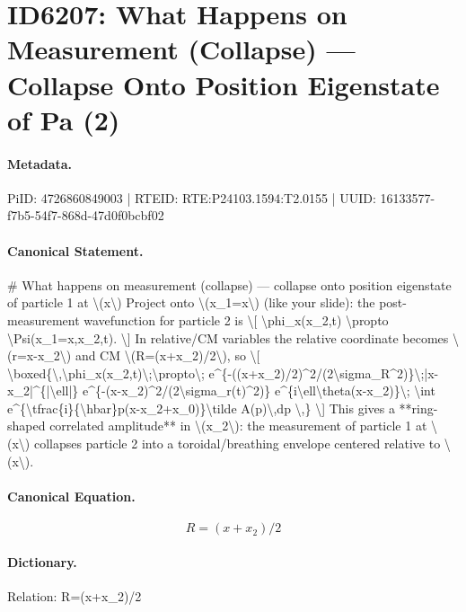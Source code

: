 \section*{ID6207: What Happens on Measurement (Collapse) — Collapse Onto Position Eigenstate of Pa (2)}
\paragraph{Metadata.}
PiID: 4726860849003 | RTEID: RTE:P24103.1594:T2.0155 | UUID: 16133577-f7b5-54f7-868d-47d0f0bcbf02

\paragraph{Canonical Statement.}
\# What happens on measurement (collapse) — collapse onto position eigenstate of particle 1 at \textbackslash{}(x\textbackslash{}) Project onto \textbackslash{}(x\_1=x\textbackslash{}) (like your slide): the post-measurement wavefunction for particle 2 is \textbackslash{}[ \textbackslash{}phi\_x(x\_2,t) \textbackslash{}propto \textbackslash{}Psi(x\_1=x,x\_2,t). \textbackslash{}] In relative/CM variables the relative coordinate becomes \textbackslash{}(r=x-x\_2\textbackslash{}) and CM \textbackslash{}(R=(x+x\_2)/2\textbackslash{}), so \textbackslash{}[ \textbackslash{}boxed\{\textbackslash{},\textbackslash{}phi\_x(x\_2,t)\textbackslash{};\textbackslash{}propto\textbackslash{}; e\textasciicircum{}\{-((x+x\_2)/2)\textasciicircum{}2/(2\textbackslash{}sigma\_R\textasciicircum{}2)\}\textbackslash{};|x-x\_2|\textasciicircum{}\{|\textbackslash{}ell|\} e\textasciicircum{}\{-(x-x\_2)\textasciicircum{}2/(2\textbackslash{}sigma\_r(t)\textasciicircum{}2)\} e\textasciicircum{}\{i\textbackslash{}ell\textbackslash{}theta(x-x\_2)\}\textbackslash{}; \textbackslash{}int e\textasciicircum{}\{\textbackslash{}tfrac\{i\}\{\textbackslash{}hbar\}p(x-x\_2+x\_0)\}\textbackslash{}tilde A(p)\textbackslash{},dp \textbackslash{},\} \textbackslash{}] This gives a **ring-shaped correlated amplitude** in \textbackslash{}(x\_2\textbackslash{}): the measurement of particle 1 at \textbackslash{}(x\textbackslash{}) collapses particle 2 into a toroidal/breathing envelope centered relative to \textbackslash{}(x\textbackslash{}).

\paragraph{Canonical Equation.}
\[
R=(x+x_2)/2
\]

\paragraph{Dictionary.}
Relation: R=(x+x\_2)/2

